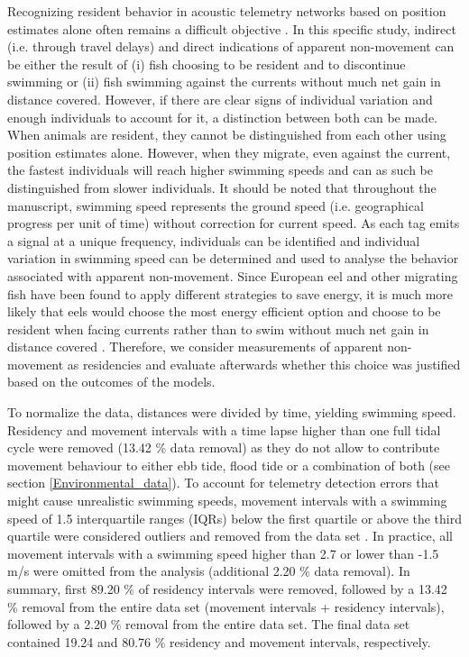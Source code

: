 \documentclass[preprint,12pt,authoryear]{elsarticle}
\begin{document}
Recognizing resident behavior in acoustic telemetry networks based on position estimates alone often remains a difficult objective \citep{Cagua2015}. In this specific study, indirect (i.e. through travel delays) and direct indications of apparent non-movement can be either the result of (i) fish choosing to be resident and to discontinue swimming or (ii) fish swimming against the currents without much net gain in distance covered. However, if there are clear signs of individual variation and enough individuals to account for it, a distinction between both can be made. When animals are resident, they cannot be distinguished from each other using position estimates alone. However, when they migrate, even against the current, the fastest individuals will reach higher swimming speeds and can as such be distinguished from slower individuals. It should be noted that throughout the manuscript, swimming speed represents the ground speed (i.e. geographical progress per unit of time) without correction for current speed. As each tag emits a signal at a unique frequency, individuals can be identified and individual variation in swimming speed can be determined and used to analyse the behavior associated with apparent non-movement. Since European eel and other migrating fish have been found to apply different strategies to save energy, it is much more likely that eels would choose the most energy efficient option and choose to be resident when facing currents rather than to swim without much net gain in distance covered \citep{Arnold1984FishShelf,Glebe1981Migration,Metcalfe1990TheSea}. Therefore, we consider measurements of apparent non-movement as residencies and evaluate afterwards whether this choice was justified based on the outcomes of the models.

To normalize the data, distances were divided by time, yielding swimming speed. Residency and movement intervals with a time lapse higher than one full tidal cycle were removed (13.42 \% data removal) as they do not allow to contribute movement behaviour to either ebb tide, flood tide or a combination of both (see section \ref{Environmental_data}). 
To account for telemetry detection errors that might cause unrealistic swimming speeds, movement intervals with a swimming speed  of 1.5 interquartile ranges (IQRs) below the first quartile or above the third quartile were considered outliers and removed from the data set \citep{Tukey1977ExploratoryAnalysis}. In practice, all movement intervals with a swimming speed higher than 2.7 or lower than -1.5 m/s were omitted from the analysis (additional 2.20 \% data removal). In summary, first 89.20 \% of residency intervals were removed, followed by a 13.42 \% removal from the entire data set (movement intervals + residency intervals), followed by a 2.20 \% removal from the entire data set. The final data set contained 19.24 and 80.76 \% residency and movement intervals, respectively. 
\end{document}
